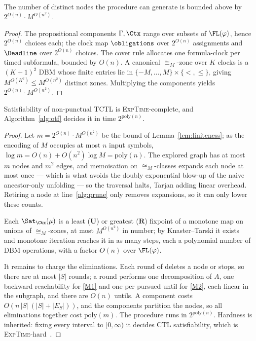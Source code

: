 \begin{lemma}\label{lem:finiteness}
The number of distinct nodes the procedure can generate is bounded above by
$2^{O(n)}\cdot M^{O(n^2)}$.
\end{lemma}
\begin{proof}
The propositional components $\Gamma,\Ctx$ range over subsets of $\FL(\varphi)$, hence $2^{O(n)}$
choices each; the clock map $\obligations$ over $2^{O(n)}$ assignments and $\Deadline$ over $2^{O(n)}$
choices. The cover rule allocates one formula-clock per timed subformula, bounded by $O(n)$. A
canonical $\cong_M$-zone over $K$ clocks is a $(K{+}1)^2$ DBM whose finite entries lie in
$\{-M,\dots,M\}\times\{<,\le\}$, giving $M^{O(K^2)}\le M^{O(n^2)}$ distinct zones. Multiplying the
components yields $2^{O(n)}\cdot M^{O(n^2)}$.
\end{proof}

\begin{theorem}\label{thm:complexity}
Satisfiability of non-punctual TCTL is \textsc{ExpTime}-complete, and Algorithm~\ref{alg:otf} decides
it in time $2^{\mathrm{poly}(n)}$.
\end{theorem}
\begin{proof}
Let $m=2^{O(n)}\cdot M^{O(n^2)}$ be the bound of Lemma~\ref{lem:finiteness}; as the encoding of $M$
occupies at most $n$ input symbols, $\log m=O(n)+O(n^2)\log M=\mathrm{poly}(n)$. The explored graph
has at most $m$ nodes and $m^2$ edges, and memoisation on $\cong_M$-classes expands each node at most
once --- which is what avoids the doubly exponential blow-up of the naive ancestor-only unfolding ---
so the traversal halts, Tarjan adding linear overhead. Retiring a node at
line~\ref{alg:prune} only removes expansions, so it can only lower these counts.

Each $\Sat_{\Ctx}(\mu)$ is a least ($\mathbf U$) or greatest ($\mathbf R$) fixpoint of a monotone map
on unions of $\cong_M$-zones, at most $M^{O(n^2)}$ in number; by Knaster--Tarski it exists and
monotone iteration reaches it in as many steps, each a polynomial number of DBM operations, with a
factor $O(n)$ over $\FL(\varphi)$.

It remains to charge the eliminations. Each round of  deletes a node or stops, so there are
at most $|S|$ rounds; a round performs one decomposition of $A$, one backward reachability for
\ref{M1} and one per pursued until for \ref{M2}, each linear in the subgraph, and there are $O(n)$
untils. A component costs $O(n\,|S|\,(|S|+|E_S|))$, and the components partition the nodes, so all
eliminations together cost $\mathrm{poly}(m)$. The procedure runs in $2^{\mathrm{poly}(n)}$.
Hardness is inherited: fixing every interval to $[0,\infty)$ it decides CTL satisfiability, which is
\textsc{ExpTime}-hard~\cite{Clarke99}.
\end{proof}

